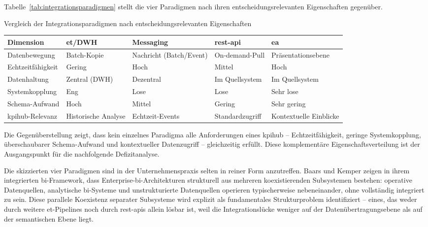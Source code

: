 Tabelle~\ref{tab:integrationsparadigmen} stellt die vier Paradigmen nach ihren entscheidungsrelevanten Eigenschaften gegenüber.

\begin{batable}[label=tab:integrationsparadigmen]{Vergleich der Integrationsparadigmen nach entscheidungsrelevanten Eigenschaften}
\small\setlength{\tabcolsep}{6pt}\renewcommand{\arraystretch}{1.4}
\begin{tabular}{|p{2.8cm}|p{2.4cm}|p{2.4cm}|p{2.4cm}|p{2.4cm}|}
\hline
\textbf{Dimension} & \textbf{\gls{et}/DWH} & \textbf{Messaging} & \textbf{\gls{rest}-\gls{api}} & \textbf{\gls{ea}} \\
\hline
Datenbewegung & Batch-Kopie & Nachricht (Batch/Event) & On-demand-Pull & Präsen\-tations\-ebene \\
\hline
Echtzeitfähigkeit & Gering & Hoch & Mittel & Hoch \\
\hline
Datenhaltung & Zentral (DWH) & Dezentral & Im \mbox{Quellsystem} & Im \mbox{Quellsystem} \\
\hline
Systemkopplung & Eng & Lose & Lose & Sehr lose \\
\hline
Schema-Aufwand & Hoch & Mittel & Gering & Sehr gering \\
\hline
\gls{kpihub}-Relevanz & Historische Analyse & Echtzeit-Events & Standard\-zugriff & Kontextuelle Einblicke \\
\hline
\end{tabular}
\end{batable}

Die Gegenüberstellung zeigt, dass kein einzelnes Paradigma alle Anforderungen eines \gls{kpihub} -- Echtzeitfähigkeit, geringe Systemkopplung, überschaubarer Schema-Aufwand und kontextueller Datenzugriff -- gleichzeitig erfüllt.
Diese komplementäre Eigenschaftsverteilung ist der Ausgangspunkt für die nachfolgende Defizitanalyse.

Die skizzierten vier Paradigmen sind in der Unternehmenspraxis selten in reiner Form anzutreffen.
Baars und Kemper zeigen in ihrem integrierten \gls{bi}-Framework, dass Enterprise-\gls{bi}-Architekturen strukturell aus mehreren koexistierenden Subsystemen bestehen: operative Datenquellen, analytische \gls{bi}-Systeme und unstrukturierte Datenquellen operieren typischerweise nebeneinander, ohne vollständig integriert zu sein.
Diese parallele Koexistenz separater Subsysteme wird explizit als fundamentales Strukturproblem identifiziert -- eines, das weder durch weitere \gls{et}-Pipelines noch durch \gls{rest}-\glspl{api} allein lösbar ist, weil die Integrationslücke weniger auf der Datenübertragungsebene als auf der semantischen Ebene liegt.

